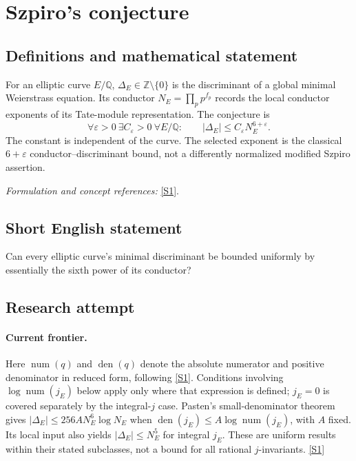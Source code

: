 \documentclass[11pt,a4paper]{article}
\newcommand{\Z}{\mathbb{Z}}
\newcommand{\Q}{\mathbb{Q}}
\newcommand{\sref}[2]{\hyperlink{source:#1:#2}{[S#2]}}
\newif\ifshowcatalogue
\newcommand{\cataloguescope}[1]{\ifshowcatalogue
 \paragraph{Exact scope in the supplied catalogue.}
 \begin{quote}\small #1\end{quote}\fi}
\numberwithin{equation}{section}
\begin{document}
\setcounter{section}{0}
\clearpage
\section*{\texorpdfstring{Szpiro's conjecture}{Szpiro's conjecture}}\label{9400090}
\subsection{Definitions and mathematical statement}
For an elliptic curve $E/\Q$, $\Delta_E\in\Z\setminus\{0\}$ is the discriminant of a global minimal Weierstrass equation. Its conductor $N_E=\prod_p p^{f_p}$ records the local conductor exponents of its Tate-module representation. The conjecture is
\[
 \forall\varepsilon>0\ \exists C_\varepsilon>0\ \forall E/\Q:\qquad
 |\Delta_E|\le C_\varepsilon N_E^{6+\varepsilon}.
\]
The constant is independent of the curve. The selected exponent is the classical $6+\varepsilon$ conductor--discriminant bound, not a differently normalized modified Szpiro assertion.
\par\smallskip\textit{Formulation and concept references:} \sref{9400090}{1}.
\cataloguescope{Prove or disprove that for every epsilon>0 there is C(epsilon)>0 such that every elliptic curve E over Q with minimal discriminant Delta\_E and conductor N\_E satisfies |Delta\_E| <= C(epsilon)*N\_E\textasciicircum{}(6+epsilon).}
\subsection{Short English statement}
Can every elliptic curve's minimal discriminant be bounded uniformly by essentially the sixth power of its conductor?
\subsection{Research attempt}

\paragraph{Current frontier.}
Here $\operatorname{num}(q)$ and $\operatorname{den}(q)$ denote the absolute
numerator and positive denominator in reduced form, following \sref{9400090}{1}.
Conditions involving $\log\operatorname{num}(j_E)$ below apply only where
that expression is defined; $j_E=0$ is covered separately by the integral-$j$
case.
Pasten's small-denominator theorem gives
$|\Delta_E|\leq256A N_E^6\log N_E$ when
$\operatorname{den}(j_E)\leq A\log\operatorname{num}(j_E)$, with $A$ fixed.
Its local input also yields $|\Delta_E|\leq N_E^5$ for integral $j_E$.
These are uniform results within their stated subclasses, not a bound for
all rational $j$-invariants. \sref{9400090}{1}
\end{document}
